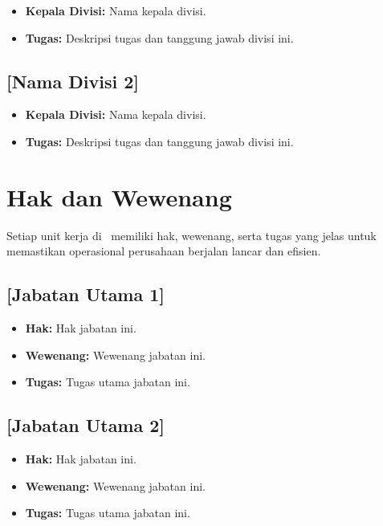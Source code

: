 \begin{itemize}[leftmargin=*, itemsep=0pt]
  \item \textbf{Kepala Divisi:} Nama kepala divisi.
  \item \textbf{Tugas:} Deskripsi tugas dan tanggung jawab divisi ini.
\end{itemize}

\subsection{[Nama Divisi 2]}

\begin{itemize}[leftmargin=*, itemsep=0pt]
  \item \textbf{Kepala Divisi:} Nama kepala divisi.
  \item \textbf{Tugas:} Deskripsi tugas dan tanggung jawab divisi ini.
\end{itemize}

\section{Hak dan Wewenang}

Setiap unit kerja di \NamaPerusahaan\ memiliki hak, wewenang, serta tugas yang
jelas untuk memastikan operasional perusahaan berjalan lancar dan efisien.

\subsection{[Jabatan Utama 1]}

\begin{itemize}[leftmargin=*, itemsep=0pt]
  \item \textbf{Hak:} Hak jabatan ini.
  \item \textbf{Wewenang:} Wewenang jabatan ini.
  \item \textbf{Tugas:} Tugas utama jabatan ini.
\end{itemize}

\subsection{[Jabatan Utama 2]}

\begin{itemize}[leftmargin=*, itemsep=0pt]
  \item \textbf{Hak:} Hak jabatan ini.
  \item \textbf{Wewenang:} Wewenang jabatan ini.
  \item \textbf{Tugas:} Tugas utama jabatan ini.
\end{itemize}

